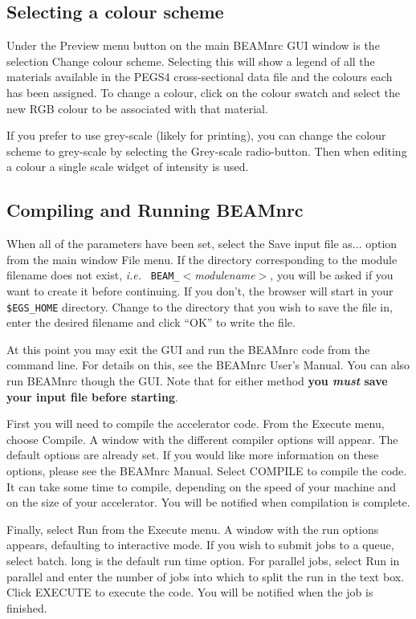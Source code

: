 \documentclass[12pt,twoside]{article}
\newcommand{\ie}{{\em i.e.}}
\begin{document}
\subsection{Selecting a colour scheme}

Under the {\sf Preview} menu button on the main {\sf BEAMnrc GUI} window is
the selection {\sf Change colour scheme}.  Selecting this will show a
legend of all the materials available in the PEGS4 cross-sectional data
file and the colours each has been assigned.  To change a colour, click
on the colour swatch and select the new RGB colour to be associated with
that material.

If you prefer to use grey-scale (likely for printing), you can change the
colour scheme to grey-scale by selecting the {\sf Grey-scale}
radio-button.  Then when editing a colour a single scale widget of
intensity is used.

\subsection{Compiling and Running BEAMnrc}

When all of the parameters have been set, select the {\sf Save input file
as...} option from the main window {\sf File} menu.  If the directory
corresponding to the module filename does
not exist, \ie~ {\tt BEAM\_}$<${\em modulename}$>$, you will be asked if
you want to create it before
continuing.  If you don't, the browser will start in your {\tt \$EGS\_HOME}
directory.  Change to the directory that you wish to save the file in,
enter the desired filename and click ``OK'' to write the file.

At this point you may exit the GUI and run the BEAMnrc code from the
command line.  For details on this, see the
BEAMnrc User's Manual\cite{Ro04a}.  You can also run BEAMnrc though the GUI.
Note that for either method {\bfseries you {\it must} save your input file
before starting}.

First you will need to compile the accelerator code.  From the {\sf
Execute} menu, choose {\sf Compile}.  A window with the different
compiler options will appear.  The default options are already set.  If
you would like more information on these options, please see the BEAMnrc
Manual.  Select {\sf COMPILE} to compile the code.  It can take some
time to compile, depending on the speed of your machine and on the size
of your accelerator.  You will be notified when compilation is complete.

Finally, select {\sf Run} from the {\sf Execute} menu.  A window with
the run options appears, defaulting to interactive mode.  If you wish to
submit jobs to a queue, select {\sf batch}. {\sf long} is the default
run time option.  For parallel jobs, select {\sf Run in parallel} and
enter the number of jobs into which to split the run in the text box.
Click {\sf EXECUTE} to execute the code.  You will be notified when the
job is finished.
\end{document}

